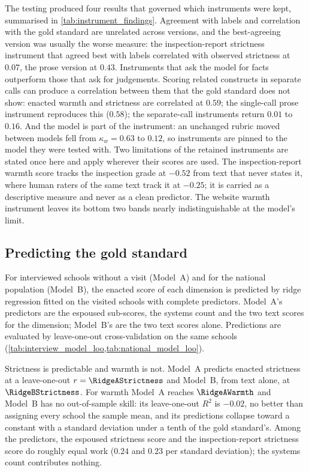 The testing produced four results that governed which instruments were kept,
summarised in \cref{tab:instrument_findings}. Agreement with labels and
correlation with the gold standard are unrelated across versions, and the
best-agreeing version was usually the worse measure: the inspection-report
strictness instrument that agreed best with labels correlated with observed
strictness at $0.07$, the prose version at $0.43$. Instruments that ask the
model for facts outperform those that ask for judgements. Scoring related
constructs in separate calls can produce a correlation between them that the
gold standard does not show: enacted warmth and strictness are correlated at
$0.59$; the single-call prose instrument reproduces this ($0.58$); the
separate-call instruments return $0.01$ to $0.16$. And the model is part of
the instrument: an unchanged rubric moved between models fell from
$\kappa_w = 0.63$ to $0.12$, so instruments are pinned to the model they were
tested with. Two limitations of the retained instruments are stated once here
and apply wherever their scores are used. The inspection-report warmth score
tracks the inspection grade at $-0.52$ from text that never states it, where
human raters of the same text track it at $-0.25$; it is carried as a
descriptive measure and never as a clean predictor. The website warmth
instrument leaves its bottom two bands nearly indistinguishable at the model's
limit.



\subsection{Predicting the gold standard}

For interviewed schools without a visit (Model~A) and for the national
population (Model~B), the enacted score of each dimension is predicted by
ridge regression fitted on the \RidgeTrainN{} visited schools with complete
predictors. Model~A's predictors are the espoused sub-scores, the systems
count and the two text scores for the dimension; Model~B's are the two text
scores alone. Predictions are evaluated by leave-one-out cross-validation on
the same schools (\cref{tab:interview_model_loo,tab:national_model_loo}).

Strictness is predictable and warmth is not. Model~A predicts enacted
strictness at a leave-one-out $r = \RidgeAStrictness$ and Model~B, from text
alone, at $\RidgeBStrictness$. For warmth Model~A reaches $\RidgeAWarmth$ and
Model~B has no out-of-sample skill: its leave-one-out $R^2$ is $-0.02$, no
better than assigning every school the sample mean, and its predictions
collapse toward a constant with a standard deviation under a tenth of the
gold standard's. Among the predictors, the espoused strictness score and the
inspection-report strictness score do roughly equal work ($0.24$ and $0.23$
per standard deviation); the systems count contributes nothing.

